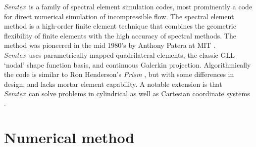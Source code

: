\documentclass[11pt]{report}
\newcommand{\Semtex}{\emph{Semtex}} \newcommand{\Dog}{\emph{Dog}}
\begin{document}
\Semtex\ is a family of spectral element simulation codes, most
prominently a code for direct numerical simulation of incompressible
flow.  The spectral element method is a high-order finite element
technique that combines the geometric flexibility of finite elements
with the high accuracy of spectral methods.  The method was pioneered
in the mid 1980's by Anthony Patera at MIT
\citep{pat84,kp86}. \Semtex\ uses parametrically mapped quadrilateral
elements, the classic GLL `nodal' shape function basis, and continuous
Galerkin projection.  Algorithmically the code is similar to Ron
Henderson's \emph{Prism} \citep{hk95,kh98,hen99b}, but with some
differences in design, and lacks mortar element capability. A notable
extension is that \Semtex\ can solve problems in cylindrical as well
as Cartesian coordinate systems \citep{blsh04}.

\section{Numerical method}
\end{document}
